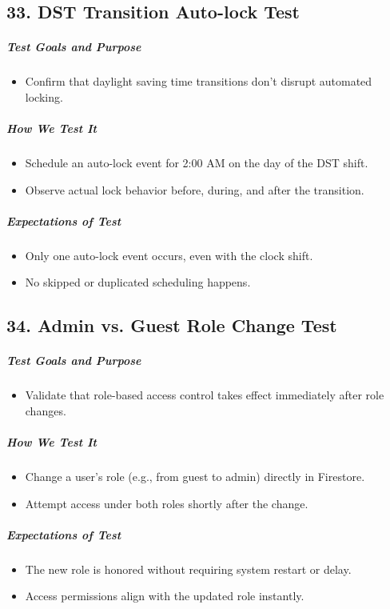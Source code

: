 \subsection*{33. DST Transition Auto-lock Test}
\subparagraph{Test Goals and Purpose}
\begin{itemize}
    \item Confirm that daylight saving time transitions don't disrupt automated locking.
\end{itemize}
\subparagraph{How We Test It}
\begin{itemize}
    \item Schedule an auto-lock event for 2:00 AM on the day of the DST shift.
    \item Observe actual lock behavior before, during, and after the transition.
\end{itemize}
\subparagraph{Expectations of Test}
\begin{itemize}
    \item Only one auto-lock event occurs, even with the clock shift.
    \item No skipped or duplicated scheduling happens.
\end{itemize}

\subsection*{34. Admin vs. Guest Role Change Test}
\subparagraph{Test Goals and Purpose}
\begin{itemize}
    \item Validate that role-based access control takes effect immediately after role changes.
\end{itemize}
\subparagraph{How We Test It}
\begin{itemize}
    \item Change a user's role (e.g., from guest to admin) directly in Firestore.
    \item Attempt access under both roles shortly after the change.
\end{itemize}
\subparagraph{Expectations of Test}
\begin{itemize}
    \item The new role is honored without requiring system restart or delay.
    \item Access permissions align with the updated role instantly.
\end{itemize}